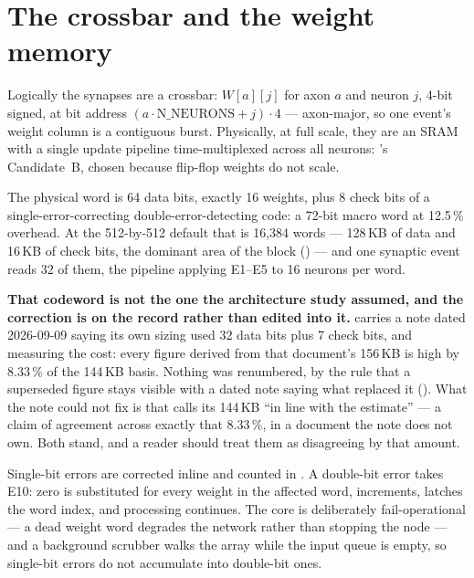 \section{The crossbar and the weight memory}

Logically the synapses are a crossbar: $W[a][j]$ for axon $a$ and
neuron $j$, 4-bit signed, at bit address
$(a \cdot \mathrm{N\_NEURONS} + j)\cdot 4$ --- axon-major, so one
event's weight column is a contiguous burst. Physically, at full scale,
they are an SRAM with a single update pipeline time-multiplexed across
all neurons: 's Candidate~B, chosen because
flip-flop weights do not scale.

The physical word is 64 data bits, exactly 16 weights, plus 8 check
bits of a single-error-correcting double-error-detecting code: a 72-bit
macro word at 12.5\,\% overhead. At the 512-by-512 default that is
16,384 words --- 128\,KB of data and 16\,KB of check bits, the dominant
area of the block () --- and one synaptic event
reads 32 of them, the pipeline applying E1--E5 to 16 neurons per
word.

\textbf{That codeword is not the one the architecture study assumed,
and the correction is on the record rather than edited into it.}
 carries a note dated 2026-09-09 saying its own
sizing used 32 data bits plus 7 check bits, and measuring the cost:
every figure derived from that document's 156\,KB is high by 8.33\,\%
of the 144\,KB basis. Nothing was renumbered, by the rule that a
superseded figure stays visible with a dated note saying what replaced
it (). What the note could not fix is that
 calls its 144\,KB ``in line with the
 estimate'' --- a claim of agreement across exactly that
8.33\,\%, in a document the note does not own. Both stand, and a reader
should treat them as disagreeing by that amount.

Single-bit errors are corrected inline and counted in .
A double-bit error takes E10: zero is substituted for every weight in
the affected word,  increments, 
latches the word index, and processing continues. The core is
deliberately fail-operational --- a dead weight word degrades the
network rather than stopping the node --- and a background scrubber
walks the array while the input queue is empty, so single-bit errors do
not accumulate into double-bit ones.

